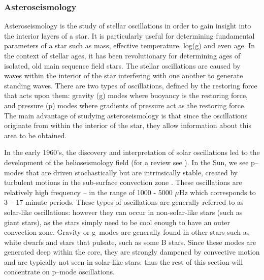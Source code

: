 \subsubsection{Asteroseismology}
Asteroseismology is the study of stellar oscillations in order to gain insight into the interior layers of a star. It is particularly useful for determining fundamental parameters of a star such as mass, effective temperature, log(g) and even age. In the context of stellar ages, it has been revolutionary for determining ages of isolated, old main sequence field stars. The stellar oscillations are caused by waves within the interior of the star interfering with one another to generate standing waves. There are two types of oscillations, defined by the restoring force that acts upon them: gravity (g) modes where buoyancy is the restoring force, and pressure (p) modes where gradients of pressure act as the restoring force. The main advantage of studying asteroseismology is that since the oscillations originate from within the interior of the star, they allow information about this area to be obtained.

In the early 1960's, the discovery and interpretation of solar oscillations led to the development of the helioseismology field (for a review see \citealt{Christensen-Dalsgaard_2002}). In the Sun, we see p--modes that are  driven stochastically but are intrinsically stable, created by turbulent motions in the sub-surface convection zone \citep{Samadi_Goupil_2001}. These oscillations are relatively high frequency -- in the range of 1000 - 5000 $\mu$Hz which corresponds to 3 -- 17 minute periods. These types of oscillations are generally referred to as solar-like oscillations: however they can occur in non-solar-like stars (such as giant stars), as the stars simply need to be cool enough to have an outer convection zone. Gravity or g--modes are generally found in other stars such as white dwarfs and stars that pulsate, such as some B stars. Since these modes are generated deep within the core, they are strongly dampened by convective motion and are typically not seen in solar-like stars: thus the rest of this section will concentrate on p--mode oscillations.

